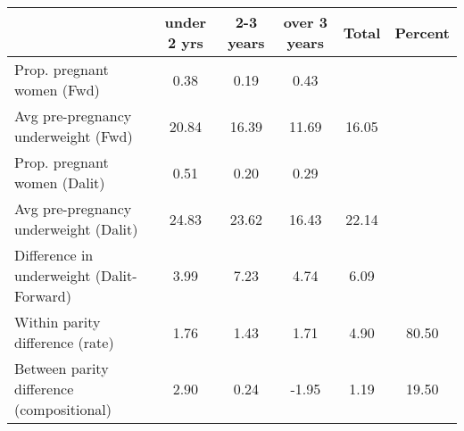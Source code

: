\begin{tabular}{l*{5}{c}}
\toprule
            &\multicolumn{1}{c}{under 2 yrs}&\multicolumn{1}{c}{2-3 years}&\multicolumn{1}{c}{over 3 years}&\multicolumn{1}{c}{Total}&\multicolumn{1}{c}{Percent}\\
\midrule
\midrule
Prop. pregnant women (Fwd)&        0.38&        0.19&        0.43&            &            \\
Avg pre-pregnancy underweight (Fwd)&       20.84&       16.39&       11.69&       16.05&            \\
Prop. pregnant women (Dalit)&        0.51&        0.20&        0.29&            &            \\
Avg pre-pregnancy underweight (Dalit)&       24.83&       23.62&       16.43&       22.14&            \\
Difference in underweight (Dalit-Forward)&        3.99&        7.23&        4.74&        6.09&            \\
Within parity difference (rate)&        1.76&        1.43&        1.71&        4.90&       80.50\\
Between parity difference (compositional)&        2.90&        0.24&       -1.95&        1.19&       19.50\\
\bottomrule
\end{tabular}
